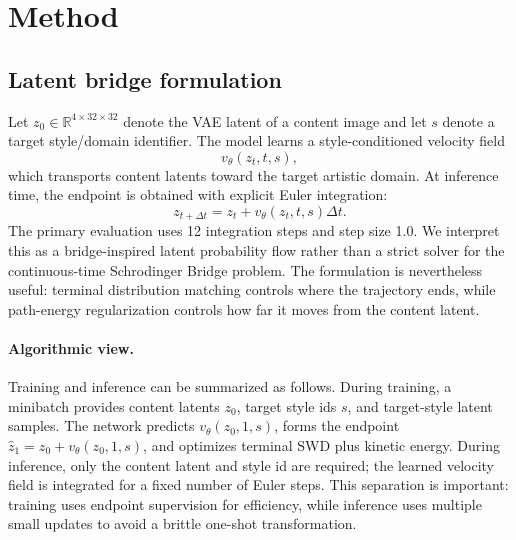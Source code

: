 ﻿\documentclass{article}
\begin{document}
\section{Method}
\subsection{Latent bridge formulation}
Let $z_0 \in \mathbb{R}^{4 \times 32 \times 32}$ denote the VAE latent of a content image and let $s$ denote a target style/domain identifier. The model learns a style-conditioned velocity field
\begin{equation}
    v_\theta(z_t,t,s),
\end{equation}
which transports content latents toward the target artistic domain. At inference time, the endpoint is obtained with explicit Euler integration:
\begin{equation}
    z_{t+\Delta t} = z_t + v_\theta(z_t,t,s)\Delta t .
\end{equation}
The primary evaluation uses 12 integration steps and step size 1.0. We interpret this as a bridge-inspired latent probability flow rather than a strict solver for the continuous-time Schrodinger Bridge problem. The formulation is nevertheless useful: terminal distribution matching controls where the trajectory ends, while path-energy regularization controls how far it moves from the content latent.

\paragraph{Algorithmic view.}
Training and inference can be summarized as follows. During training, a minibatch provides content latents $z_0$, target style ids $s$, and target-style latent samples. The network predicts $v_\theta(z_0,1,s)$, forms the endpoint $\hat{z}_1=z_0+v_\theta(z_0,1,s)$, and optimizes terminal SWD plus kinetic energy. During inference, only the content latent and style id are required; the learned velocity field is integrated for a fixed number of Euler steps. This separation is important: training uses endpoint supervision for efficiency, while inference uses multiple small updates to avoid a brittle one-shot transformation.
\end{document}
